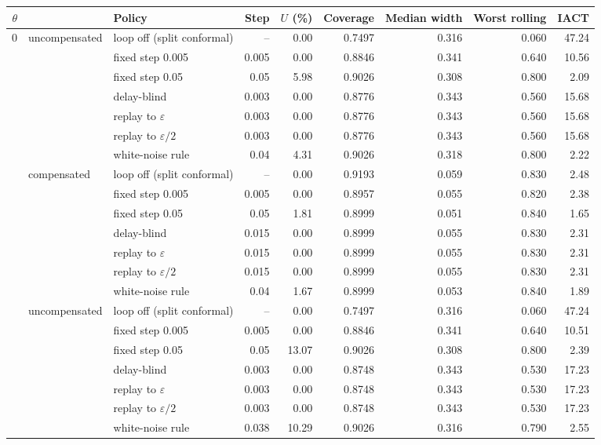 \begin{tabular}{@{}rllrrrrrr@{}}
\toprule
$\theta$ & & Policy & Step & $U$ (\%) & Coverage & Median width & Worst rolling & IACT \\
\midrule
0 & uncompensated & loop off (split conformal) & -- & 0.00 & 0.7497 & 0.316 & 0.060 & 47.24 \\
 &  & fixed step 0.005 & 0.005 & 0.00 & 0.8846 & 0.341 & 0.640 & 10.56 \\
 &  & fixed step 0.05 & 0.05 & 5.98 & 0.9026 & 0.308 & 0.800 & 2.09 \\
 &  & delay-blind & 0.003 & 0.00 & 0.8776 & 0.343 & 0.560 & 15.68 \\
 &  & replay to $\varepsilon$ & 0.003 & 0.00 & 0.8776 & 0.343 & 0.560 & 15.68 \\
 &  & replay to $\varepsilon/2$ & 0.003 & 0.00 & 0.8776 & 0.343 & 0.560 & 15.68 \\
 &  & white-noise rule & 0.04 & 4.31 & 0.9026 & 0.318 & 0.800 & 2.22 \\
 & compensated & loop off (split conformal) & -- & 0.00 & 0.9193 & 0.059 & 0.830 & 2.48 \\
 &  & fixed step 0.005 & 0.005 & 0.00 & 0.8957 & 0.055 & 0.820 & 2.38 \\
 &  & fixed step 0.05 & 0.05 & 1.81 & 0.8999 & 0.051 & 0.840 & 1.65 \\
 &  & delay-blind & 0.015 & 0.00 & 0.8999 & 0.055 & 0.830 & 2.31 \\
 &  & replay to $\varepsilon$ & 0.015 & 0.00 & 0.8999 & 0.055 & 0.830 & 2.31 \\
 &  & replay to $\varepsilon/2$ & 0.015 & 0.00 & 0.8999 & 0.055 & 0.830 & 2.31 \\
 &  & white-noise rule & 0.04 & 1.67 & 0.8999 & 0.053 & 0.840 & 1.89 \\
\addlinespace
1 & uncompensated & loop off (split conformal) & -- & 0.00 & 0.7497 & 0.316 & 0.060 & 47.24 \\
 &  & fixed step 0.005 & 0.005 & 0.00 & 0.8846 & 0.341 & 0.640 & 10.51 \\
 &  & fixed step 0.05 & 0.05 & 13.07 & 0.9026 & 0.308 & 0.800 & 2.39 \\
 &  & delay-blind & 0.003 & 0.00 & 0.8748 & 0.343 & 0.530 & 17.23 \\
 &  & replay to $\varepsilon$ & 0.003 & 0.00 & 0.8748 & 0.343 & 0.530 & 17.23 \\
 &  & replay to $\varepsilon/2$ & 0.003 & 0.00 & 0.8748 & 0.343 & 0.530 & 17.23 \\
 &  & white-noise rule & 0.038 & 10.29 & 0.9026 & 0.316 & 0.790 & 2.55 \\

\end{tabular}
